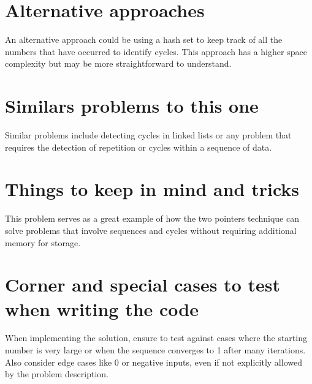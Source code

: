 \section*{Alternative approaches}
An alternative approach could be using a hash set to keep track of all the numbers that have occurred to identify cycles. This approach has a higher space complexity but may be more straightforward to understand.

\section*{Similars problems to this one}
Similar problems include detecting cycles in linked lists or any problem that requires the detection of repetition or cycles within a sequence of data.

\section*{Things to keep in mind and tricks}
This problem serves as a great example of how the two pointers technique can solve problems that involve sequences and cycles without requiring additional memory for storage.

\section*{Corner and special cases to test when writing the code}
When implementing the solution, ensure to test against cases where the starting number is very large or when the sequence converges to 1 after many iterations. Also consider edge cases like 0 or negative inputs, even if not explicitly allowed by the problem description.